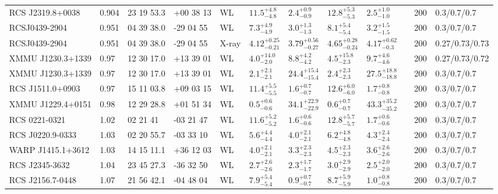 \begin{landscape}
\begin{center}
{\begin{longtable}{llllllllllll}
RCS J2319.8+0038 & 0.904 & 23 19 53.3 & +00 38 13 & WL & ${11.5}^{+4.8}_{-4.8}$ & ${2.4}^{+0.9}_{-0.9}$ & ${12.8}^{+5.3}_{-5.3}$ & ${2.5}^{+1.0}_{-1.0}$ & \citet{SE14.1} & 200 & 0.3/0.7/0.7 \\
RCSJ0439-2904 & 0.951 & 04 39 38.0 & -29 04 55 & WL & ${7.3}^{+4.9}_{-4.9}$ & ${3.0}^{+1.3}_{-1.3}$ & ${8.1}^{+5.4}_{-5.4}$ & ${3.2}^{+1.5}_{-1.5}$ & \citet{SE14.1} & 200 & 0.3/0.7/0.7 \\
RCSJ0439-2904 & 0.951 & 04 39 38.0 & -29 04 55 & X-ray & ${4.12}^{+0.25}_{-0.21}$ & ${3.79}^{+0.56}_{-0.27}$ & ${4.65}^{+0.28}_{-0.24}$ & ${4.17}^{+0.62}_{-0.3}$ & \citet{BA14.1} & 200 & 0.27/0.73/0.73 \\
XMMU J1230.3+1339 & 0.97 & 12 30 17.0 & +13 39 01 & WL & ${4.0}^{+14.0}_{-2.0}$ & ${8.8}^{+4.2}_{-4.2}$ & ${4.5}^{+15.8}_{-2.3}$ & ${9.7}^{+4.6}_{-4.6}$ & \citet{LE11.1} & 200 & 0.27/0.73/0.72 \\
XMMU J1230.3+1339 & 0.97 & 12 30 17.0 & +13 39 01 & WL & ${2.1}^{+2.1}_{-2.1}$ & ${24.4}^{+15.4}_{-15.4}$ & ${2.4}^{+2.3}_{-2.3}$ & ${27.5}^{+18.8}_{-18.8}$ & \citet{SE14.1} & 200 & 0.3/0.7/0.7 \\
RCS J1511.0+0903 & 0.97 & 15 11 03.8 & +09 03 15 & WL & ${11.4}^{+5.5}_{-5.5}$ & ${1.6}^{+0.7}_{-0.7}$ & ${12.6}^{+6.0}_{-6.0}$ & ${1.7}^{+0.8}_{-0.8}$ & \citet{SE14.1} & 200 & 0.3/0.7/0.7 \\
XMMU J1229.4+0151 & 0.98 & 12 29 28.8 & +01 51 34 & WL & ${0.5}^{+0.6}_{-0.6}$ & ${34.1}^{+22.9}_{-22.9}$ & ${0.6}^{+0.7}_{-0.7}$ & ${43.3}^{+35.2}_{-35.2}$ & \citet{SE14.1} & 200 & 0.3/0.7/0.7 \\
RCS 0221-0321 & 1.02 & 02 21 41 & -03 21 47 & WL & ${11.6}^{+5.2}_{-5.2}$ & ${1.6}^{+0.6}_{-0.6}$ & ${12.8}^{+5.7}_{-5.7}$ & ${1.7}^{+0.6}_{-0.6}$ & \citet{SE14.1} & 200 & 0.3/0.7/0.7 \\
RCS J0220.9-0333 & 1.03 & 02 20 55.7 & -03 33 10 & WL & ${5.6}^{+4.4}_{-4.4}$ & ${4.0}^{+2.1}_{-2.1}$ & ${6.2}^{+4.8}_{-4.8}$ & ${4.3}^{+2.4}_{-2.4}$ & \citet{SE14.1} & 200 & 0.3/0.7/0.7 \\
WARP J1415.1+3612 & 1.03 & 14 15 11.1 & +36 12 03 & WL & ${4.0}^{+2.1}_{-2.1}$ & ${3.3}^{+2.3}_{-2.3}$ & ${4.5}^{+2.3}_{-2.3}$ & ${3.6}^{+2.6}_{-2.6}$ & \citet{SE14.1} & 200 & 0.3/0.7/0.7 \\
RCS J2345-3632 & 1.04 & 23 45 27.3 & -36 32 50 & WL & ${2.7}^{+2.6}_{-2.6}$ & ${2.3}^{+1.7}_{-1.7}$ & ${3.0}^{+2.9}_{-2.9}$ & ${2.5}^{+2.0}_{-2.0}$ & \citet{SE14.1} & 200 & 0.3/0.7/0.7 \\
RCS J2156.7-0448 & 1.07 & 21 56 42.1 & -04 48 04 & WL & ${7.9}^{+5.4}_{-5.4}$ & ${0.9}^{+0.7}_{-0.7}$ & ${8.7}^{+5.9}_{-5.9}$ & ${1.0}^{+0.8}_{-0.8}$ & \citet{SE14.1} & 200 & 0.3/0.7/0.7 \\

\end{longtable}}
\end{center}
\end{landscape}
